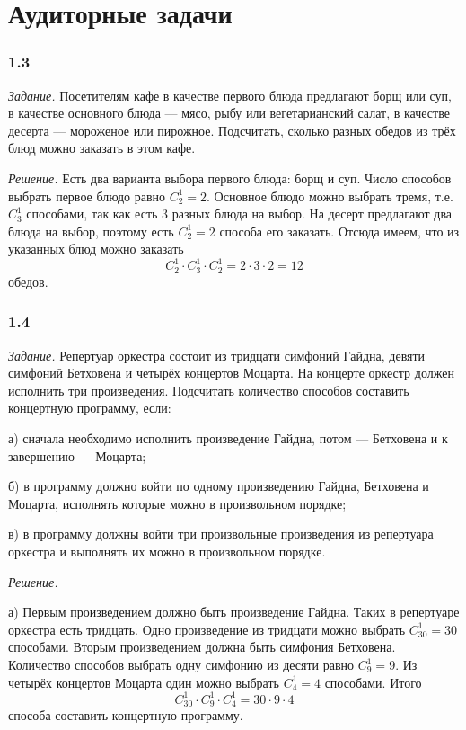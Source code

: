 \documentclass{book}
\begin{document}
\section*{Аудиторные задачи}

\subsubsection*{1.3}

\textit{Задание.} Посетителям кафе в качестве первого блюда предлагают борщ или суп, в качестве основного блюда --- мясо, рыбу или вегетарианский салат, в качестве десерта --- мороженое или пирожное.
Подсчитать, сколько разных обедов из трёх блюд можно заказать в этом кафе.

\textit{Решение.} Есть два варианта выбора первого блюда: борщ и суп.
Число способов выбрать первое блюдо равно $C_2^1=2$.
Основное блюдо можно выбрать тремя, т.е. $C_3^1$ способами, так как есть 3 разных блюда на выбор.
На десерт предлагают два блюда на выбор, поэтому есть $C_2^1=2$ способа его заказать.
Отсюда имеем, что из указанных блюд можно заказать
$$ C_2^1 \cdot C_3^1 \cdot C_2^1 = 2 \cdot 3 \cdot 2 = 12 $$ обедов.

\subsubsection*{1.4}

\textit{Задание.} Репертуар оркестра состоит из тридцати симфоний Гайдна, девяти симфоний Бетховена и четырёх концертов Моцарта.
На концерте оркестр должен исполнить три произведения.
Подсчитать количество способов составить концертную программу, если:

а) сначала необходимо исполнить произведение Гайдна, потом --- Бетховена и к завершению --- Моцарта;

б) в программу должно войти по одному произведению Гайдна, Бетховена и Моцарта, исполнять которые можно в произвольном порядке;

в) в программу должны войти три произвольные произведения из репертуара оркестра и выполнять их можно в произвольном порядке.

\textit{Решение.} 

а) Первым произведением должно быть произведение Гайдна.
Таких в репертуаре оркестра есть тридцать.
Одно произведение из тридцати можно выбрать $C_{30}^1=30$ способами.
Вторым произведением должна быть симфония Бетховена.
Количество способов выбрать одну симфонию из десяти равно $C_9^1=9$.
Из четырёх концертов Моцарта один можно выбрать $C_4^1=4$ способами.
Итого $$C_{30}^1\cdot C_9^1\cdot C_4^1=30\cdot 9\cdot 4$$ способа составить концертную программу.
\end{document}
